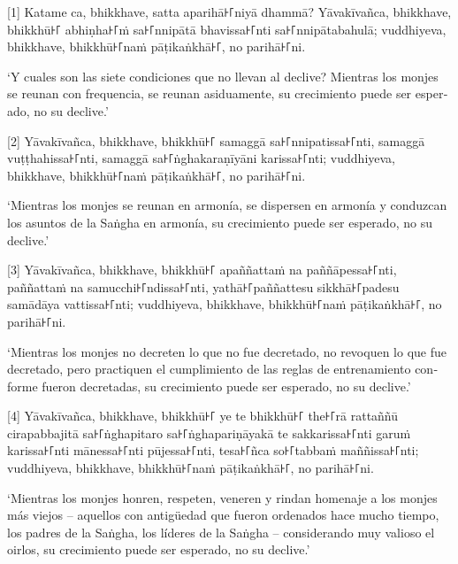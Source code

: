 [1] Katame ca, bhikkhave, satta aparihā꜔꜒niyā dhammā? Yāvakīvañca, bhikkhave, bhikkhū꜔꜒
abhiṇha꜔꜒ṁ sa꜔꜒nnipātā bhavissa꜔꜒nti sa꜔꜒nnipātabahulā; vuddhiyeva, bhikkhave,
bhikkhū꜔꜒naṁ pāṭikaṅkhā꜔꜒, no parihā꜔꜒ni.

\begin{english}
  `Y cuales son las siete condiciones que no llevan al declive? Mientras los monjes
  se reunan con frequencia, se reunan asiduamente, su crecimiento puede ser
  esperado, no su declive.'

\end{english}

[2] Yāvakīvañca, bhikkhave, bhikkhū꜔꜒ samaggā sa꜔꜒nnipatissa꜔꜒nti, samaggā
vuṭṭhahissa꜔꜒nti, samaggā sa꜔꜒ṅghakaraṇīyāni karissa꜔꜒nti; vuddhiyeva, bhikkhave,
bhikkhū꜔꜒naṁ pāṭikaṅkhā꜔꜒, no parihā꜔꜒ni.

\begin{english}
  `Mientras los monjes se reunan en armonía, se dispersen en
  armonía y conduzcan los asuntos de la Saṅgha en armonía, su crecimiento puede ser
  esperado, no su declive.'
\end{english}

[3] Yāvakīvañca, bhikkhave, bhikkhū꜔꜒ apaññattaṁ na paññāpessa꜔꜒nti, paññattaṁ na
samucchi꜔꜒ndissa꜔꜒nti, yathā꜔꜒paññattesu sikkhā꜔꜒padesu samādāya vattissa꜔꜒nti;
vuddhiyeva, bhikkhave, bhikkhū꜔꜒naṁ pāṭikaṅkhā꜔꜒, no parihā꜔꜒ni.

\begin{english}
  `Mientras los monjes no decreten lo que no fue decretado, no revoquen lo que
  fue decretado, pero practiquen el cumplimiento de las reglas de entrenamiento conforme
  fueron decretadas, su crecimiento puede ser
  esperado, no su declive.'
\end{english}

[4] Yāvakīvañca, bhikkhave, bhikkhū꜔꜒ ye te bhikkhū꜔꜒ the꜔꜒rā rattaññū cirapabbajitā
sa꜔꜒ṅghapitaro sa꜔꜒ṅghapariṇāyakā te sakkarissa꜔꜒nti garuṁ karissa꜔꜒nti mānessa꜔꜒nti
pūjessa꜔꜒nti, tesa꜔꜒ñca so꜔꜒tabbaṁ maññissa꜔꜒nti; vuddhiyeva, bhikkhave, bhikkhū꜔꜒naṁ
pāṭikaṅkhā꜔꜒, no parihā꜔꜒ni.

\begin{english}
  `Mientras los monjes honren, respeten, veneren y rindan homenaje a los
  monjes más viejos -- aquellos con antigüedad que fueron ordenados hace mucho
  tiempo, los padres de la Saṅgha, los líderes de la Saṅgha -- considerando muy valioso
  el oirlos, su crecimiento puede ser
  esperado, no su declive.'
\end{english}

